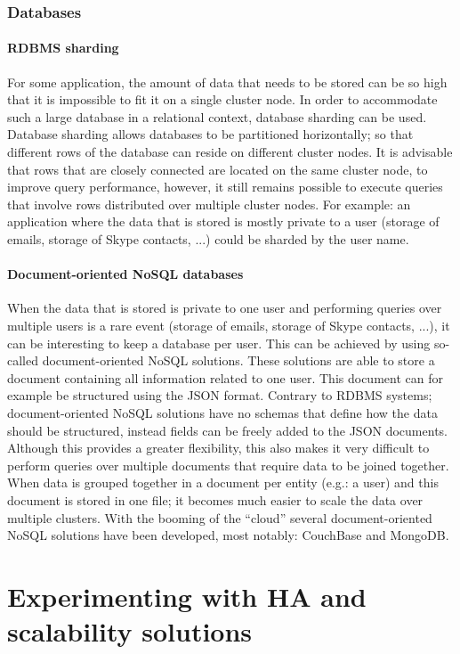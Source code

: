 \documentclass[12pt]{report}
\begin{document}
\subsection{Databases}
\subsubsection{RDBMS sharding}
For some application, the amount of data that needs to be stored can be so high
that it is impossible to fit it on a single cluster node. In order to
accommodate such a large database in a relational context, database
sharding can be used. Database sharding allows databases to be
partitioned horizontally; so that different rows of the database can
reside on different cluster nodes. It is advisable that rows that are
closely connected are located on the same cluster node, to improve
query performance, however, it still remains possible to execute
queries that involve rows distributed over multiple cluster nodes.
For example: an application where the data that is stored is mostly 
private to a user (storage of emails, storage of Skype contacts, ...)
 could be sharded by the user name.
\subsubsection{Document-oriented NoSQL databases}
\label{sec:no_sql}
When the data that is stored is private to one user and performing
queries over multiple users is a rare event (storage of emails,
storage of Skype contacts, ...), it can be interesting to keep a
database per user. This can be achieved by using so-called
document-oriented NoSQL solutions. 
These solutions are able to store a document
containing all information related to one user. This document can for
example be structured using the JSON format. Contrary to RDBMS
systems; document-oriented NoSQL solutions have no schemas that define
how the data should be structured, instead fields can be freely added
to the JSON documents.
Although this provides a greater flexibility, this also makes it very
difficult to perform queries over multiple documents that require data
to be joined together.
When data is grouped together in a document per entity (e.g.: a user)
and this document is stored in one file; it becomes much easier to scale the data over
multiple clusters.
With the booming of the ``cloud'' several document-oriented NoSQL
solutions have been developed, most notably: CouchBase and MongoDB.

\chapter{Experimenting with HA and scalability solutions}
\end{document}
